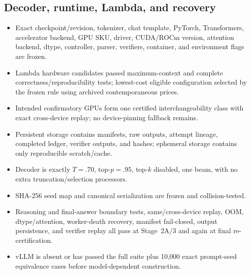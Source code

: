 \documentclass[11pt,a4paper]{article}
\begin{document}
\subsection{Decoder, runtime, Lambda, and recovery}
\begin{itemize}
\item[$\square$] Exact checkpoint/revision, tokenizer, chat template, PyTorch, Transformers, accelerator backend, GPU SKU, driver, CUDA/ROCm version, attention backend, dtype, controller, parser, verifiers, container, and environment flags are frozen.
\item[$\square$] Lambda hardware candidates passed maximum-context and complete correctness/reproducibility tests; lowest-cost eligible configuration selected by the frozen rule using archived contemporaneous prices.
\item[$\square$] Intended confirmatory GPUs form one certified interchangeability class with exact cross-device replay; no device-pinning fallback remains.
\item[$\square$] Persistent storage contains manifests, raw outputs, attempt lineage, completed ledger, verifier outputs, and hashes; ephemeral storage contains only reproducible scratch/cache.
\item[$\square$] Decoder is exactly $T=.70$, top-$p=.95$, top-$k$ disabled, one beam, with no extra truncation/selection processors.
\item[$\square$] SHA-256 seed map and canonical serialization are frozen and collision-tested.
\item[$\square$] Reasoning and final-answer boundary tests, same/cross-device replay, OOM, dtype/attention, worker-death recovery, manifest fail-closed, output persistence, and verifier replay all pass at Stage~2A/3 and again at final re-certification.
\item[$\square$] vLLM is absent or has passed the full suite plus 10,000 exact prompt-seed equivalence cases before model-dependent construction.
\end{itemize}
\end{document}
